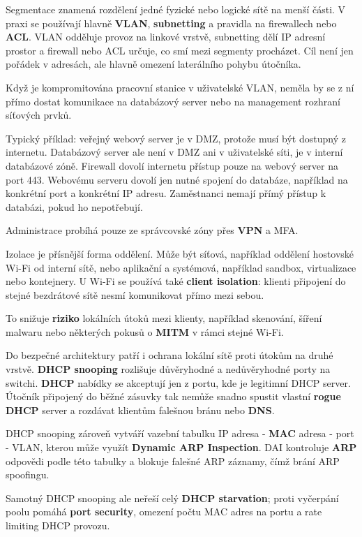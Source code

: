 Segmentace znamená rozdělení jedné fyzické nebo logické sítě na menší části. V praxi se používají hlavně \textbf{VLAN}, \textbf{subnetting} a pravidla na firewallech nebo \textbf{ACL}. VLAN odděluje provoz na linkové vrstvě, subnetting dělí IP adresní prostor a firewall nebo ACL určuje, co smí mezi segmenty procházet. Cíl není jen pořádek v adresách, ale hlavně omezení laterálního pohybu útočníka.

Když je kompromitována pracovní stanice v uživatelské VLAN, neměla by se z ní přímo dostat komunikace na databázový server nebo na management rozhraní síťových prvků.

Typický příklad: veřejný webový server je v DMZ, protože musí být dostupný z internetu. Databázový server ale není v DMZ ani v uživatelské síti, je v interní databázové zóně. Firewall dovolí internetu přístup pouze na webový server na port 443. Webovému serveru dovolí jen nutné spojení do databáze, například na konkrétní port a konkrétní IP adresu. Zaměstnanci nemají přímý přístup k databázi, pokud ho nepotřebují.

Administrace probíhá pouze ze správcovské zóny přes \textbf{VPN} a MFA.

Izolace je přísnější forma oddělení. Může být síťová, například oddělení hostovské Wi-Fi od interní sítě, nebo aplikační a systémová, například sandbox, virtualizace nebo kontejnery. U Wi-Fi se používá také \textbf{client isolation}: klienti připojení do stejné bezdrátové sítě nesmí komunikovat přímo mezi sebou.

To snižuje \textbf{riziko} lokálních útoků mezi klienty, například skenování, šíření malwaru nebo některých pokusů o \textbf{MITM} v rámci stejné Wi-Fi.

Do bezpečné architektury patří i ochrana lokální sítě proti útokům na druhé vrstvě. \textbf{DHCP snooping} rozlišuje důvěryhodné a nedůvěryhodné porty na switchi. \textbf{DHCP} nabídky se akceptují jen z portu, kde je legitimní DHCP server. Útočník připojený do běžné zásuvky tak nemůže snadno spustit vlastní \textbf{rogue DHCP} server a rozdávat klientům falešnou bránu nebo \textbf{DNS}.

DHCP snooping zároveň vytváří vazební tabulku IP adresa - \textbf{MAC} adresa - port - VLAN, kterou může využít \textbf{Dynamic ARP Inspection}. DAI kontroluje \textbf{ARP} odpovědi podle této tabulky a blokuje falešné ARP záznamy, čímž brání ARP spoofingu.

Samotný DHCP snooping ale neřeší celý \textbf{DHCP starvation}; proti vyčerpání poolu pomáhá \textbf{port security}, omezení počtu MAC adres na portu a rate limiting DHCP provozu.

